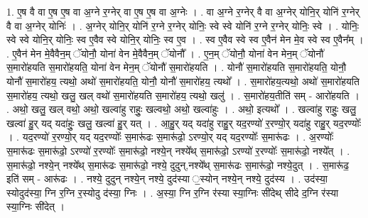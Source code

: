 \documentclass[17pt]{extarticle}
\begin{document}
1. ए॒ष वै वा ए॒ष ए॒ष वा अ॒ग्ने र॒ग्नेर् वा ए॒ष ए॒ष वा अ॒ग्नेः । . वा अ॒ग्ने र॒ग्नेर् वै वा अ॒ग्नेर् योनि॒र् योनि॑ र॒ग्नेर् वै वा अ॒ग्नेर् योनिः॑ । . अ॒ग्नेर् योनि॒र् योनि॑ र॒ग्ने र॒ग्नेर् योनिः॒ स्वे स्वे योनि॑ र॒ग्ने र॒ग्नेर् योनिः॒ स्वे । . योनिः॒ स्वे स्वे योनि॒र् योनिः॒ स्व ए॒वैव स्वे योनि॒र् योनिः॒ स्व ए॒व । . स्व ए॒वैव स्वे स्व ए॒वैन॑ मेन मे॒व स्वे स्व ए॒वैन᳚म् । . ए॒वैन॑ मेन मे॒वैवैन॒म् ॅयोनौ॒ योना॑ वेन मे॒वैवैन॒म् ॅयोनौ᳚ । . ए॒न॒म् ॅयोनौ॒ योना॑ वेन मेन॒म् ॅयोनौ॑ स॒मारो॑हयति स॒मारो॑हयति॒ योना॑ वेन मेन॒म् ॅयोनौ॑ स॒मारो॑हयति । . योनौ॑ स॒मारो॑हयति स॒मारो॑हयति॒ योनौ॒ योनौ॑ स॒मारो॑हय॒ त्यथो॒ अथो॑ स॒मारो॑हयति॒ योनौ॒ योनौ॑ स॒मारो॑हय॒ त्यथो᳚ । . स॒मारो॑हय॒त्यथो॒ अथो॑ स॒मारो॑हयति स॒मारो॑हय॒ त्यथो॒ खलु॒ खल् वथो॑ स॒मारो॑हयति स॒मारो॑हय॒
त्यथो॒ खलु॑ । . स॒मारो॑हय॒तीति॑ सम् - आरो॑हयति । . अथो॒ खलु॒ खल् वथो॒ अथो॒ खल्वा॑हु राहुः॒ खल्वथो॒ अथो॒ खल्वा॑हुः । . अथो॒ इत्यथो᳚ । . खल्वा॑हु राहुः॒ खलु॒ खल्वा॑ हु॒र् यद् यदा॑हुः॒ खलु॒ खल्वा॑ हु॒र् यत् । . आ॒हु॒र् यद् यदा॑हु राहु॒र् यद॒रण्यो॑ र॒रण्यो॒र् यदा॑हु राहु॒र् यद॒रण्योः᳚ । . यद॒रण्यो॑ र॒रण्यो॒र् यद् यद॒रण्योः᳚ स॒मारू॑ढः स॒मारू॑ढो॒ ऽरण्यो॒र् यद् यद॒रण्योः᳚ स॒मारू॑ढः । . अ॒रण्योः᳚ स॒मारू॑ढः स॒मारू॑ढो॒ ऽरण्यो॑ र॒रण्योः᳚ स॒मारू॑ढो॒ नश्ये॒न् नश्ये᳚थ् स॒मारू॑ढो॒ ऽरण्यो॑ र॒रण्योः᳚ स॒मारू॑ढो॒ नश्ये᳚त् । . स॒मारू॑ढो॒ नश्ये॒न् नश्ये᳚थ् स॒मारू॑ढः स॒मारू॑ढो॒ नश्ये॒ दुदुन्,नश्ये᳚थ् स॒मारू॑ढः स॒मारू॑ढो॒ नश्ये॒दुत् । . स॒मारू॑ढ॒ इति॑ सम् - आरू॑ढः । . नश्ये॒ दुदुन् नश्ये॒न् नश्ये॒ दुद॑स्या ॒स्योन् नश्ये॒न् नश्ये॒ दुद॑स्य । . उद॑स्या॒ स्योदुद॑स्या॒ ग्नि र॒ग्नि र॒स्योदु द॑स्या॒ ग्निः । . अ॒स्या॒ ग्नि र॒ग्नि र॑स्या स्या॒ग्निः सी॑देथ् सीदे द॒ग्नि र॑स्या स्या॒ग्निः सी॑देत् । \newline
\end{document}
